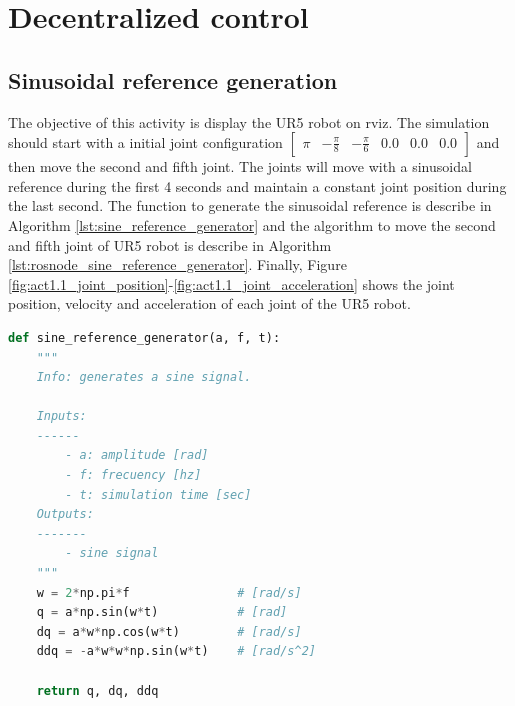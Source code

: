 \section{Decentralized control}
\subsection{Sinusoidal reference generation}
The objective of this activity is display the UR5 robot on rviz. The simulation should start with a initial joint configuration $\begin{bmatrix} \pi & -\frac{\pi}{8} & -\frac{\pi}{6} & 0.0 & 0.0 & 0.0 \end{bmatrix}$ and then move the second and fifth joint. The joints will move with a sinusoidal reference during the first 4 seconds and maintain a constant joint position during the last second. The function to generate the sinusoidal reference is describe in Algorithm \ref{lst:sine_reference_generator} and the algorithm to move the second and fifth joint of UR5 robot is describe in Algorithm \ref{lst:rosnode_sine_reference_generator}. Finally, Figure \ref{fig:act1.1_joint_position}-\ref{fig:act1.1_joint_acceleration} shows the joint position, velocity and acceleration of each joint of the UR5 robot.

\begin{lstlisting}[language=Python,caption=Function to generate sinusoidal reference., label={lst:sine_reference_generator}]
def sine_reference_generator(a, f, t):
    """
    Info: generates a sine signal.

    Inputs: 
    ------
        - a: amplitude [rad]
        - f: frecuency [hz]
        - t: simulation time [sec]
    Outputs:
    -------
        - sine signal
    """
    w = 2*np.pi*f               # [rad/s]
    q = a*np.sin(w*t)           # [rad]
    dq = a*w*np.cos(w*t)        # [rad/s]
    ddq = -a*w*w*np.sin(w*t)    # [rad/s^2]

    return q, dq, ddq
\end{lstlisting}

